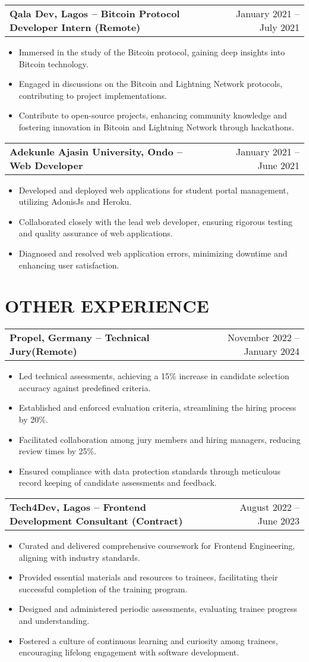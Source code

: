 \documentclass[a4paper,12pt]{article}
\makeatletter
\newenvironment{joblong}[2]
    {
    \begin{tabularx}{\linewidth}{@{}l X r@{}}
    \textbf{#1} & \hfill &  #2 \\[3.75pt]
    \end{tabularx}
    \begin{minipage}[t]{\linewidth}
    \begin{itemize}[nosep,after=\strut, leftmargin=1em, itemsep=3pt,label=--]
    }
    {
    \end{itemize}
    \end{minipage}    
    }
\makeatother
\begin{document}
\begin{joblong}{Qala Dev, Lagos -- Bitcoin Protocol Developer Intern (Remote)}{January 2021 -- July 2021}
\item Immersed in the study of the Bitcoin protocol, gaining deep insights into Bitcoin technology.
\item Engaged in discussions on the Bitcoin and Lightning Network protocols, contributing to project implementations.
\item Contribute to open-source projects, enhancing community knowledge and fostering innovation in Bitcoin and Lightning Network through hackathons.
\end{joblong}

\begin{joblong}{Adekunle Ajasin University, Ondo -- Web Developer}{January 2021 -- June 2021}
\item Developed and deployed web applications for student portal management, utilizing AdonisJs and Heroku.
\item Collaborated closely with the lead web developer, ensuring rigorous testing and quality assurance of web applications.
\item Diagnosed and resolved web application errors, minimizing downtime and enhancing user satisfaction.
\end{joblong}

\section{OTHER EXPERIENCE}

\begin{joblong}{Propel, Germany -- Technical Jury(Remote)}{November 2022 -- January 2024}
\item Led technical assessments, achieving a 15\% increase in candidate selection accuracy against predefined criteria.
\item Established and enforced evaluation criteria, streamlining the hiring process by 20\%.
\item Facilitated collaboration among jury members and hiring managers, reducing review times by 25\%.
\item Ensured compliance with data protection standards through meticulous record keeping of candidate assessments and feedback.
\end{joblong}

\begin{joblong}{Tech4Dev, Lagos -- Frontend Development Consultant (Contract)}{August 2022 -- June 2023}
\item Curated and delivered comprehensive coursework for Frontend Engineering, aligning with industry standards.
\item Provided essential materials and resources to trainees, facilitating their successful completion of the training program.
\item Designed and administered periodic assessments, evaluating trainee progress and understanding.
\item Fostered a culture of continuous learning and curiosity among trainees, encouraging lifelong engagement with software development.
\end{joblong}
\end{document}
